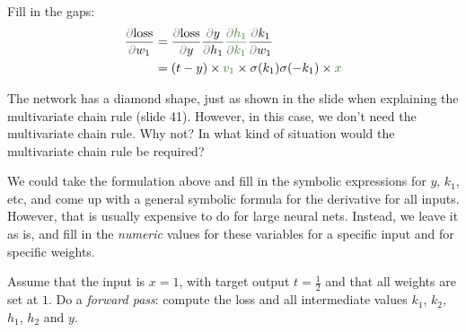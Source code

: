 \documentclass[11pt]{article}
\begin{document}
Fill in the gaps:
\begin{align}
\frac{\kp \text{loss}}{\kp w_1}
 &= \frac{\kp \text{loss}}{\kp y}\frac{\kp y}{\kp h_1} \ans{\frac{\kp h_1}{\kp k_1} }{\ldots}\frac{\kp k_1}{\kp w_1} \notag \\
 &= (t - y) \times \ans{v_1}{\ldots} \times \sigma(k_1)\sigma(-k_1) \times \ans{x}{\ldots} \label{line:chain}
\end{align}

The network has a diamond shape, just as shown in the slide when explaining the multivariate chain rule (slide 41). However, in this case, we don't need the multivariate chain rule. Why not? In what kind of situation would the multivariate chain rule be required?


We could take the formulation above and fill in the symbolic expressions for $y$, $k_1$, etc, and come up with a general symbolic formula for the derivative for all inputs. However, that is usually expensive to do for large neural nets. Instead, we leave it as is, and fill in the \emph{numeric} values for these variables for a specific input and for specific weights. 

Assume that the input is $x = 1$, with target output $t=\frac{1}{2}$ and that all weights are set at $1$. Do a \emph{forward pass}: compute the loss and all intermediate values $k_1$, $k_2$, $h_1$, $h_2$ and $y$.

\end{document}

